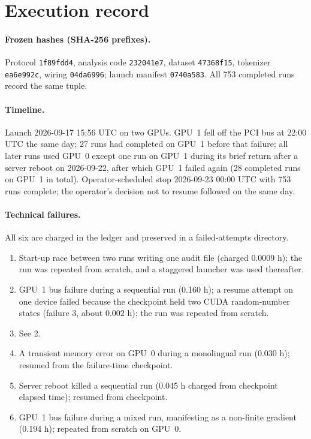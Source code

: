 \documentclass[preprint,12pt,authoryear]{elsarticle}
\begin{document}
\section{Execution record}
\label{app:execution}

\paragraph{Frozen hashes (SHA-256 prefixes).} Protocol \texttt{1f89fdd4}, analysis code \texttt{232041e7}, dataset \texttt{47368f15}, tokenizer \texttt{ea6e992c}, wiring \texttt{04da6996}; launch manifest \texttt{0740a583}.
All 753 completed runs record the same tuple.

\paragraph{Timeline.} Launch 2026-09-17 15:56 UTC on two GPUs. GPU~1 fell off the PCI bus at 22:00 UTC the same day; 27 runs had completed on GPU~1 before that failure; all later runs used GPU~0 except one run on GPU~1 during its brief return after a server reboot on 2026-09-22, after which GPU~1 failed again (28 completed runs on GPU~1 in total). Operator-scheduled stop 2026-09-23 00:00 UTC with 753 runs complete; the operator's decision not to resume followed on the same day.

\paragraph{Technical failures.} All six are charged in the ledger and preserved in a failed-attempts directory.
\begin{enumerate}
\item Start-up race between two runs writing one audit file (charged 0.0009 h); the run was repeated from scratch, and a staggered launcher was used thereafter.
\item GPU~1 bus failure during a sequential run (0.160 h); a resume attempt on one device failed because the checkpoint held two CUDA random-number states (failure 3, about 0.002 h); the run was repeated from scratch.
\item See 2.
\item A transient memory error on GPU~0 during a monolingual run (0.030 h); resumed from the failure-time checkpoint.
\item Server reboot killed a sequential run (0.045 h charged from checkpoint elapsed time); resumed from checkpoint.
\item GPU~1 bus failure during a mixed run, manifesting as a non-finite gradient (0.194 h); repeated from scratch on GPU~0.
\end{enumerate}
\end{document}

